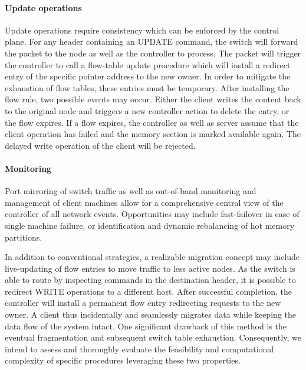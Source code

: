 \paragraph{\textbf{Update operations}}
\label{par:updates}
Update operations require consistency which can be enforced by the control plane. For any header containing an UPDATE command, the switch will forward the packet to the node as well as the controller to process.
The packet will trigger the controller to call a flow-table update procedure which will install a redirect entry of the specific pointer address to the new owner.
In order to mitigate the exhaustion of flow tables, these entries must be temporary.
After installing the flow rule, two possible events may occur. Either the client writes the content back to the original
node and triggers a new controller action to delete the entry, or the flow expires. If a flow expires, the controller as well as server assume that the client operation has failed and the memory section is marked available again. The delayed write operation of the client will be rejected. 


\paragraph{\textbf{Monitoring}}
Port mirroring of switch traffic as well as out-of-band monitoring and management of client machines allow for a comprehensive central view of the controller of all network events. Opportunities may include fast-failover in case of single machine failure, or identification and dynamic rebalancing of hot memory partitions.

In addition to conventional strategies, a realizable migration concept may include live-updating of flow entries to move traffic to less active nodes. As the switch is able to route by inspecting commands in the destination header, it is possible to redirect WRITE operations to a different host. After successful completion, the controller will install a permanent flow entry redirecting requests to the new owner.
A client thus incidentally and seamlessly migrates data while keeping the data flow of the system intact.
One significant drawback of this method is the eventual fragmentation and subsequent switch table exhaustion. 
Consequently, we intend to assess and thoroughly evaluate the feasibility and computational complexity of specific procedures leveraging these two properties.


